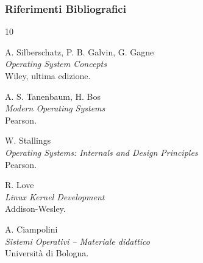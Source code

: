 \documentclass{beamer}
\begin{document}
\begin{frame}
	\frametitle{Riferimenti Bibliografici}
	
	\begin{thebibliography}{10}
		
		A. Silberschatz, P. B. Galvin, G. Gagne \\
		\textit{Operating System Concepts} \\
		Wiley, ultima edizione.
		
		A. S. Tanenbaum, H. Bos \\
		\textit{Modern Operating Systems} \\
		Pearson.
		
		W. Stallings \\
		\textit{Operating Systems: Internals and Design Principles} \\
		Pearson.
		
		R. Love \\
		\textit{Linux Kernel Development} \\
		Addison-Wesley.
		
		A. Ciampolini \\
		\textit{Sistemi Operativi -- Materiale didattico} \\
		Università di Bologna.
		
	\end{thebibliography}
	
\end{frame}
	
\end{document}
